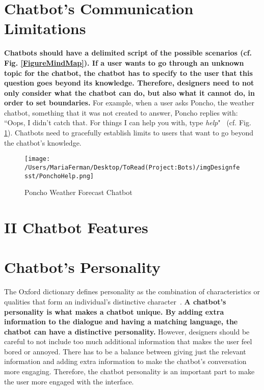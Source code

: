 \documentclass[a4paper,10pt]{article}
\begin{document}
\section{Chatbot's Communication Limitations}

\textbf{Chatbots should have a delimited script of the possible scenarios (cf. Fig. \ref{FigureMindMap}). If a user wants to go through an unknown topic for the chatbot, the chatbot has to specify to the user that this question goes beyond its knowledge. Therefore, designers need to not only consider what the chatbot can do, but also what it cannot do, in order to set boundaries.} For example, when a user asks Poncho, the weather chatbot, something that it was not created to answer, Poncho replies with: ``Oops, I didn't catch that. For things I can help you with, type \textit{help}"~\cite{HeuristicsWebPage} (cf. Fig. \ref{FigureCommunicationCapabilities}). Chatbots need to gracefully establish limits to users that want to go beyond the chatbot's knowledge.  

\begin{figure}
\centering
\texttt{[image: /Users/MariaFerman/Desktop/ToRead(Project:Bots)/imgDesignfesst/PonchoHelp.png]}
\caption{Poncho Weather Forecast Chatbot}
\label{FigureCommunicationCapabilities}
\end{figure}

\section*{II Chatbot Features}

\section{Chatbot's Personality}

The Oxford dictionary defines personality as the combination of characteristics or qualities that form an individual's distinctive character~\cite{Oxford}. \textbf{A chatbot’s personality is what makes a chatbot unique. By adding extra information to the dialogue and having a matching language, the chatbot can have a distinctive personality.} However, designers should be careful to not include too much additional information that makes the user feel bored or annoyed. There has to be a balance between giving just the relevant information and adding extra information to make the chatbot's conversation more engaging. Therefore, the chatbot personality is an important part to make the user more engaged with the interface.
\end{document}
